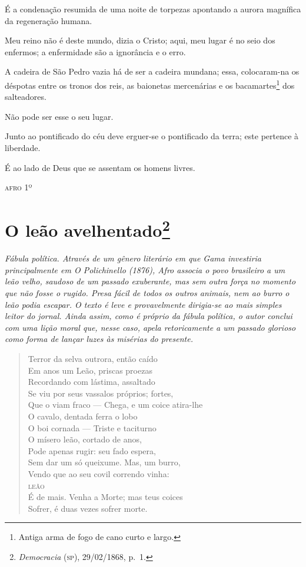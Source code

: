 É a condenação resumida de uma noite de torpezas apontando a aurora
magnífica da regeneração humana.

Meu reino não é deste mundo, dizia o Cristo; aqui, meu lugar é no seio
dos enfermos; a enfermidade são a ignorância e o erro.

A cadeira de São Pedro vazia há de ser a cadeira mundana; essa,
colocaram-na os déspotas entre os tronos dos reis, as baionetas
mercenárias e os bacamartes\footnote{Antiga arma de fogo de cano curto
  e largo.} dos salteadores.

Não pode ser esse o seu lugar.

Junto ao pontificado do céu deve erguer-se o pontificado da terra; este
pertence à liberdade.

É ao lado de Deus que se assentam os homens livres.

\begin{flushright}
\textsc{afro} 1º
\end{flushright}

\chapter{O leão avelhentado\footnote{\emph{Democracia} (\textsc{sp}),
  29/02/1868, p.~1.}}

\begin{didascalia}\itshape
Fábula política. Através de um gênero literário em que Gama investiria
principalmente em \textnormal{O Polichinello} (1876), Afro associa o
povo brasileiro a um leão velho, saudoso de um passado exuberante, mas
sem outra força no momento que não fosse o rugido. Presa fácil de todos
os outros animais, nem ao burro o leão podia escapar. O texto é leve e
provavelmente dirigia-se ao mais simples leitor do jornal. Ainda assim,
como é próprio da fábula política, o autor conclui com uma lição moral
que, nesse caso, apela retoricamente a um passado glorioso como forma de
lançar luzes às misérias do presente.
\end{didascalia}


\begin{verse}
Terror da selva outrora, então caído\\
Em anos um Leão, priscas proezas\\
Recordando com lástima, assaltado\\
Se viu por seus vassalos próprios; fortes,\\
Que o viam fraco --- Chega, e um coice atira-lhe\\
O cavalo, dentada ferra o lobo\\
O boi cornada --- Triste e taciturno\\
O mísero leão, cortado de anos,\\
Pode apenas rugir: seu fado espera,\\
Sem dar um só queixume. Mas, um burro,\\
Vendo que ao seu covil correndo vinha:\\
\textsc{leão}\\
É de mais. Venha a Morte; mas teus coices\\
Sofrer, é duas vezes sofrer morte.
\end{verse}

